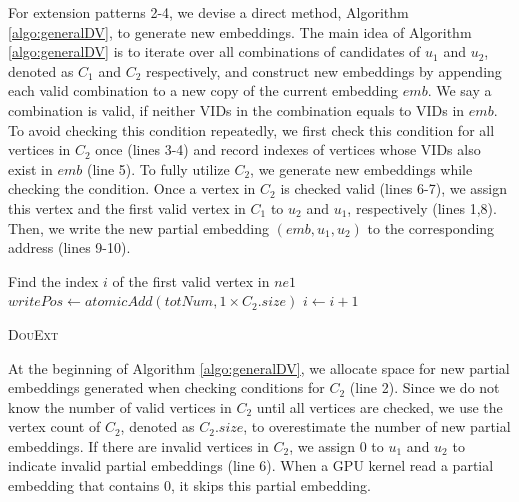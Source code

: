 For extension patterns 2-4, we devise a direct method, Algorithm \ref{algo:generalDV}, to generate new embeddings. The main idea of Algorithm \ref{algo:generalDV} is to iterate over all combinations of candidates of $u_{1}$ and $u_{2}$, denoted as $C_1$ and $C_2$ respectively, and construct new embeddings by appending each valid combination to a new copy of the current embedding $emb$. We say a combination is valid, if neither VIDs in the combination equals to VIDs in $emb$. To avoid checking this condition repeatedly, we first check this condition for all vertices in $C_2$ once (lines 3-4) and record indexes of vertices whose VIDs also exist in $emb$ (line 5). To fully utilize $C_2$, we generate new embeddings while checking the condition. Once a vertex in $C_2$ is checked valid (lines 6-7), we assign this vertex and the first valid vertex in $C_1$ to $u_2$ and $u_1$, respectively (lines 1,8). Then, we write the new partial embedding $(emb,u_1,u_2)$ to the corresponding address (lines 9-10).

\begin{algorithm}
	Find the index $i$ of the first valid vertex in $ne1$\;
	$writePos \leftarrow atomicAdd(totNum,1 \times C_{2}.size)$\;
	$i \leftarrow i+1$\;
	\caption{\textsc{DouExt}}
	\label{algo:generalDV}
\end{algorithm}

At the beginning of Algorithm \ref{algo:generalDV}, we allocate space for new partial embeddings generated when checking conditions for $C_2$ (line 2). Since we do not know the number of valid vertices in $C_2$ until all vertices are checked, we use the vertex count of $C_2$, denoted as $C_{2}.size$, to overestimate the number of new partial embeddings. If there are invalid vertices in $C_2$, we assign 0 to $u_1$ and $u_2$ to indicate invalid partial embeddings (line 6). When a GPU kernel read a partial embedding that contains 0, it skips this partial embedding.

